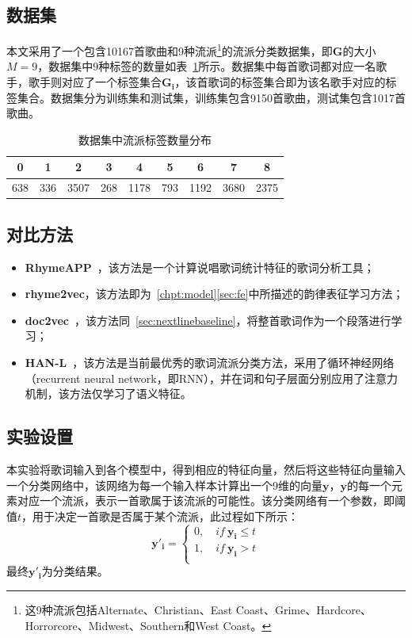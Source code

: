 \subsection{数据集}
本文采用了一个包含10167首歌曲和9种流派\footnote{这9种流派包括Alternate、Christian、East Coast、Grime、Hardcore、Horrorcore、Midwest、Southern和West Coast。}的流派分类数据集，即$\bm G$的大小$M=9$，数据集中$9$种标签的数量如表~\ref{table:genre}所示。数据集中每首歌词都对应一名歌手，歌手则对应了一个标签集合$\bm {G_i}$，该首歌词的标签集合即为该名歌手对应的标签集合。数据集分为训练集和测试集，训练集包含9150首歌曲，测试集包含1017首歌曲。\par

\begin{table}[h]
\centering
\caption{数据集中流派标签数量分布}
\label{table:genre}
\begin{tabular}{ccccccccc}
\toprule
0   & 1   & 2    & 3   & 4    & 5   & 6    & 7    & 8    \\ \midrule
638 & 336 & 3507 & 268 & 1178 & 793 & 1192 & 3680 & 2375 \\ \bottomrule
\end{tabular}
\end{table}

\subsection{对比方法}
\begin{itemize}
  \item{\bf RhymeAPP}~\autocite{hirjee2010rhyme}，该方法是一个计算说唱歌词统计特征的歌词分析工具；
  \item{\bf rhyme2vec}，该方法即为~\ref{chpt:model}\ref{sec:fe}中所描述的韵律表征学习方法；
  \item{\bf doc2vec}~\autocite{quoc2014distributed}，该方法同~\ref{sec:nextlinebaseline}，将整首歌词作为一个段落进行学习；
  \item{\bf HAN-L}~\autocite{Tsaptsinos2017lyrics}，该方法是当前最优秀的歌词流派分类方法，采用了循环神经网络（recurrent neural network，即RNN），并在词和句子层面分别应用了注意力机制，该方法仅学习了语义特征。
\end{itemize}

\subsection{实验设置}
本实验将歌词输入到各个模型中，得到相应的特征向量，然后将这些特征向量输入一个分类网络中，该网络为每一个输入样本计算出一个$9$维的向量$\bm y$，$\bm y$的每一个元素对应一个流派，表示一首歌属于该流派的可能性。该分类网络有一个参数，即阈值$t$，用于决定一首歌是否属于某个流派，此过程如下所示：
\begin{equation}
    \bm {y'_i}=\left\{
    \begin{aligned}
    0 , \quad if \ \bm{y_i}\leq t\\
    1 , \quad if \ \bm{y_i}> t\\
    \end{aligned}
    \right.
\end{equation}
最终$\bm {y'_i}$为分类结果。\par

